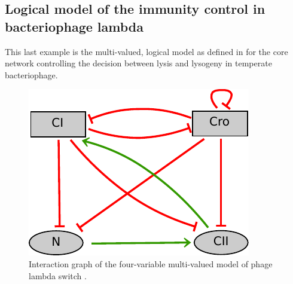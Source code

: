 \bigskip




\bigskip
\subsection{Logical model of the immunity control in bacteriophage lambda}
\label{sub:ex_phage}
This last example is the multi-valued, logical model as defined in \cite{thieffry95} for the core network controlling the decision between lysis and lysogeny in temperate bacteriophage. 

\begin{figure}[hb]
  \includegraphics{figs/phage_lambda.pdf}
  \caption{Interaction graph of the four-variable multi-valued model of phage lambda switch \cite{thieffry95}.}
  \label{ex-phage}
\end{figure}






